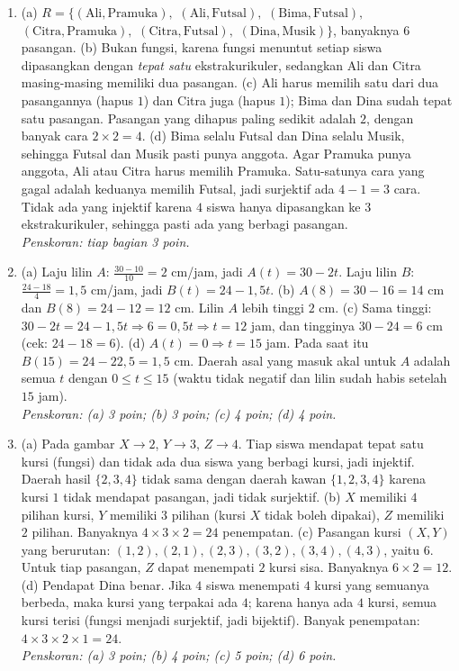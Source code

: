 \documentclass[a4paper,11pt]{article}
\newcounter{no}
\begin{document}
\par{}\par\vspace{0.2em}
\small\begin{enumerate}[leftmargin=2em,itemsep=3pt,topsep=2pt]
\item[\textbf{1.}] (a) $R=\{(\text{Ali},\text{Pramuka}),$ $(\text{Ali},\text{Futsal}),$ $(\text{Bima},\text{Futsal}),$ $(\text{Citra},\text{Pramuka}),$ $(\text{Citra},\text{Futsal}),$ $(\text{Dina},\text{Musik})\}$, banyaknya $6$ pasangan. (b) Bukan fungsi, karena fungsi menuntut setiap siswa dipasangkan dengan \emph{tepat satu} ekstrakurikuler, sedangkan Ali dan Citra masing-masing memiliki dua pasangan. (c) Ali harus memilih satu dari dua pasangannya (hapus $1$) dan Citra juga (hapus $1$); Bima dan Dina sudah tepat satu pasangan. Pasangan yang dihapus paling sedikit adalah $2$, dengan banyak cara $2\times2=4$. (d) Bima selalu Futsal dan Dina selalu Musik, sehingga Futsal dan Musik pasti punya anggota. Agar Pramuka punya anggota, Ali atau Citra harus memilih Pramuka. Satu-satunya cara yang gagal adalah keduanya memilih Futsal, jadi surjektif ada $4-1=3$ cara. Tidak ada yang injektif karena $4$ siswa hanya dipasangkan ke $3$ ekstrakurikuler, sehingga pasti ada yang berbagi pasangan. \\ \textit{Penskoran: tiap bagian 3 poin.}
\item[\textbf{2.}] (a) Laju lilin $A$: $\frac{30-10}{10}=2$ cm/jam, jadi $A(t)=30-2t$. Laju lilin $B$: $\frac{24-18}{4}=1{,}5$ cm/jam, jadi $B(t)=24-1{,}5t$. (b) $A(8)=30-16=14$ cm dan $B(8)=24-12=12$ cm. Lilin $A$ lebih tinggi $2$ cm. (c) Sama tinggi: $30-2t=24-1{,}5t\Rightarrow6=0{,}5t\Rightarrow t=12$ jam, dan tingginya $30-24=6$ cm (cek: $24-18=6$). (d) $A(t)=0\Rightarrow t=15$ jam. Pada saat itu $B(15)=24-22{,}5=1{,}5$ cm. Daerah asal yang masuk akal untuk $A$ adalah semua $t$ dengan $0\le t\le15$ (waktu tidak negatif dan lilin sudah habis setelah $15$ jam). \\ \textit{Penskoran: (a) 3 poin; (b) 3 poin; (c) 4 poin; (d) 4 poin.}
\item[\textbf{3.}] (a) Pada gambar $X\to2$, $Y\to3$, $Z\to4$. Tiap siswa mendapat tepat satu kursi (fungsi) dan tidak ada dua siswa yang berbagi kursi, jadi injektif. Daerah hasil $\{2,3,4\}$ tidak sama dengan daerah kawan $\{1,2,3,4\}$ karena kursi $1$ tidak mendapat pasangan, jadi tidak surjektif. (b) $X$ memiliki $4$ pilihan kursi, $Y$ memiliki $3$ pilihan (kursi $X$ tidak boleh dipakai), $Z$ memiliki $2$ pilihan. Banyaknya $4\times3\times2=24$ penempatan. (c) Pasangan kursi $(X,Y)$ yang berurutan: $(1,2),(2,1),(2,3),(3,2),(3,4),(4,3)$, yaitu $6$. Untuk tiap pasangan, $Z$ dapat menempati $2$ kursi sisa. Banyaknya $6\times2=12$. (d) Pendapat Dina benar. Jika $4$ siswa menempati $4$ kursi yang semuanya berbeda, maka kursi yang terpakai ada $4$; karena hanya ada $4$ kursi, semua kursi terisi (fungsi menjadi surjektif, jadi bijektif). Banyak penempatan: $4\times3\times2\times1=24$. \\ \textit{Penskoran: (a) 3 poin; (b) 4 poin; (c) 5 poin; (d) 6 poin.}
\end{enumerate}
\end{document}
